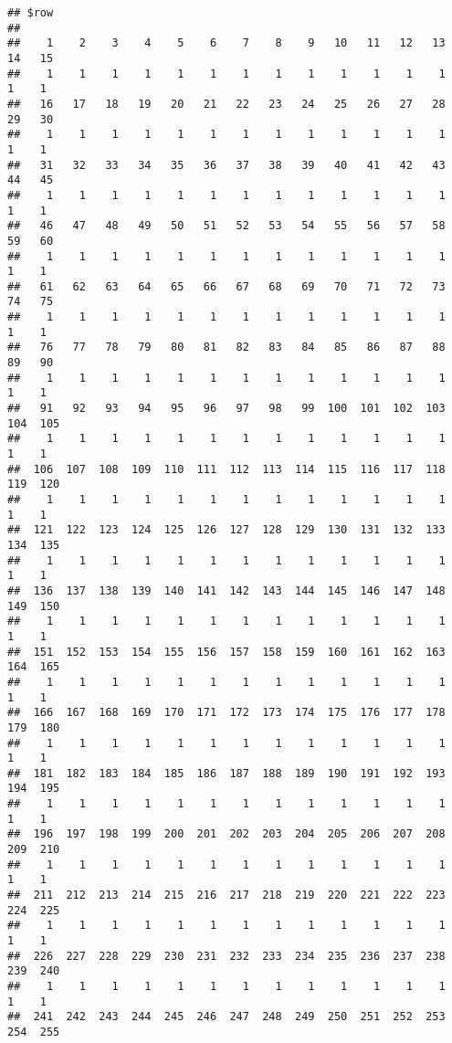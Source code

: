 \documentclass[]{article}
\begin{document}
\begin{verbatim}
## $row
## 
##    1    2    3    4    5    6    7    8    9   10   11   12   13   14   15 
##    1    1    1    1    1    1    1    1    1    1    1    1    1    1    1 
##   16   17   18   19   20   21   22   23   24   25   26   27   28   29   30 
##    1    1    1    1    1    1    1    1    1    1    1    1    1    1    1 
##   31   32   33   34   35   36   37   38   39   40   41   42   43   44   45 
##    1    1    1    1    1    1    1    1    1    1    1    1    1    1    1 
##   46   47   48   49   50   51   52   53   54   55   56   57   58   59   60 
##    1    1    1    1    1    1    1    1    1    1    1    1    1    1    1 
##   61   62   63   64   65   66   67   68   69   70   71   72   73   74   75 
##    1    1    1    1    1    1    1    1    1    1    1    1    1    1    1 
##   76   77   78   79   80   81   82   83   84   85   86   87   88   89   90 
##    1    1    1    1    1    1    1    1    1    1    1    1    1    1    1 
##   91   92   93   94   95   96   97   98   99  100  101  102  103  104  105 
##    1    1    1    1    1    1    1    1    1    1    1    1    1    1    1 
##  106  107  108  109  110  111  112  113  114  115  116  117  118  119  120 
##    1    1    1    1    1    1    1    1    1    1    1    1    1    1    1 
##  121  122  123  124  125  126  127  128  129  130  131  132  133  134  135 
##    1    1    1    1    1    1    1    1    1    1    1    1    1    1    1 
##  136  137  138  139  140  141  142  143  144  145  146  147  148  149  150 
##    1    1    1    1    1    1    1    1    1    1    1    1    1    1    1 
##  151  152  153  154  155  156  157  158  159  160  161  162  163  164  165 
##    1    1    1    1    1    1    1    1    1    1    1    1    1    1    1 
##  166  167  168  169  170  171  172  173  174  175  176  177  178  179  180 
##    1    1    1    1    1    1    1    1    1    1    1    1    1    1    1 
##  181  182  183  184  185  186  187  188  189  190  191  192  193  194  195 
##    1    1    1    1    1    1    1    1    1    1    1    1    1    1    1 
##  196  197  198  199  200  201  202  203  204  205  206  207  208  209  210 
##    1    1    1    1    1    1    1    1    1    1    1    1    1    1    1 
##  211  212  213  214  215  216  217  218  219  220  221  222  223  224  225 
##    1    1    1    1    1    1    1    1    1    1    1    1    1    1    1 
##  226  227  228  229  230  231  232  233  234  235  236  237  238  239  240 
##    1    1    1    1    1    1    1    1    1    1    1    1    1    1    1 
##  241  242  243  244  245  246  247  248  249  250  251  252  253  254  255 

\end{verbatim}
\end{document}
